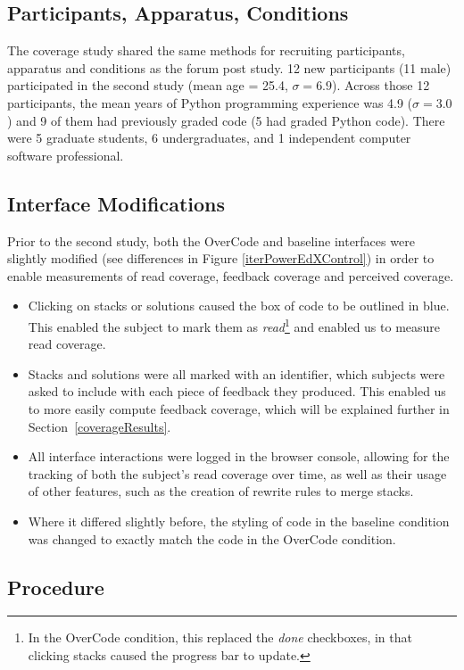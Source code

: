 \subsection{Participants, Apparatus, Conditions}

The coverage study shared the same methods for recruiting participants, apparatus and conditions as the forum post study. 12 new participants (11 male) participated in the second study (mean age = 25.4, $\sigma = 6.9$). Across those 12 participants, the mean years of Python programming experience was 4.9 ($\sigma = 3.0$) and 9 of them had previously graded code (5 had graded Python code). There were 5 graduate students, 6 undergraduates, and 1 independent computer software professional.

\subsection{Interface Modifications}
Prior to the second study, both the OverCode and baseline interfaces were slightly modified (see differences in Figure \ref{iterPowerEdXControl}) in order to enable measurements of read coverage, feedback coverage and perceived coverage.
\begin{itemize}
\item Clicking on stacks or solutions caused the box of code to be outlined in blue. This enabled the subject to mark them as \emph{read}\footnote{In the OverCode condition, this replaced the \emph{done} checkboxes, in that clicking stacks caused the progress bar to update.} and enabled us to measure read coverage.
\item Stacks and solutions were all marked with an identifier, which subjects were asked to include with each piece of feedback they produced. This enabled us to more easily compute feedback coverage, which will be explained further in Section~\ref{coverageResults}.
\item All interface interactions were logged in the browser console, allowing for the tracking of both the subject's read coverage over time, as well as their usage of other features, such as the creation of rewrite rules to merge stacks.
\item Where it differed slightly before, the styling of code in the baseline condition was changed to exactly match the code in the OverCode condition.
\end{itemize}
\subsection{Procedure}
